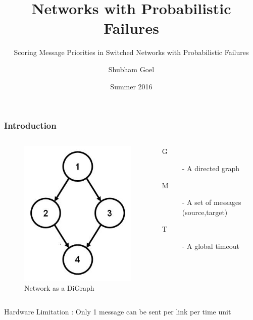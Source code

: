 \documentclass{beamer}
\begin{document}
\title[Probabilistic Networks]{Networks with Probabilistic Failures}
\subtitle[Probabilistically Scoring Message Priorities]{Scoring Message Priorities in Switched Networks with Probabilistic Failures}
\author[Shubham]{Shubham Goel}
\date[Summer 2016]{Summer 2016}

\begin{frame}[plain]
  \titlepage
\end{frame}

\begin{frame}
\frametitle{Introduction}
	\begin{columns}
	\begin{figure}
	\includegraphics[scale=0.3]{media/digraph2.jpg}
	\caption{Network as a DiGraph}
	\end{figure}
	\begin{description}
	\item[G] - A directed graph
	\item[M] - A set of messages (source,target)
	\item[T] - A global timeout
	\end{description}
	\end{columns}
	\vspace*{20pt}
	Hardware Limitation : Only 1 message can be sent per link per time unit
\end{frame}
\end{document}
